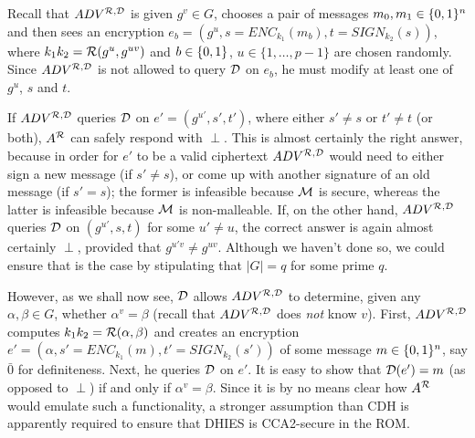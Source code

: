Recall that $ADV^{\mathcal{R},\mathcal{D}}$ is given $g^v \in G$, chooses a pair of
messages $m_0,m_1 \in \{0,1\}^{n}$ and then sees an encryption $e_b = (g^u, s =
ENC_{k_1}(m_b), t = SIGN_{k_2}(s))$, where $k_1k_2 = \mathcal{R}(g^u, g^{uv})$ and 
$b \in \{0,1\}^{}$, $u \in \{1,\ldots,p-1\}$ are chosen randomly.
Since $ADV^{\mathcal{R},\mathcal{D}}$ is not allowed to query $\mathcal{D}$ on $e_b$, he must
modify at least one of $g^u$, $s$ and $t$. 

If $ADV^{\mathcal{R},\mathcal{D}}$ queries $\mathcal{D}$ on $e' = (g^{u'}, s', t')$, where
either $s' \neq s$ or $t' \neq t$ (or both), $A^{\mathcal{R}}$ can safely respond with
$\perp$. This is almost certainly the right answer, because in order for $e'$
to be a valid ciphertext $ADV^{\mathcal{R},\mathcal{D}}$ would need to either sign a new
message (if $s' \neq s$), or come up with another signature of an old message
(if $s' = s$); the former is infeasible because $\mathcal{M}$ is secure, whereas the
latter is infeasible because $\mathcal{M}$ is non-malleable.
If, on the other hand, $ADV^{\mathcal{R},\mathcal{D}}$ queries $\mathcal{D}$ on $(g^{u'},s,t)$
for some $u' \neq u$, the correct answer is again almost certainly $\perp$,
provided that
$g^{u'v} \neq g^{uv}$. Although we haven't done so, we could ensure that
is the case by stipulating that $|G| = q$ for some prime $q$.

However, as we shall now see, $\mathcal{D}$ allows $ADV^{\mathcal{R},\mathcal{D}}$ to determine,
given any $\alpha,\beta \in G$, whether $\alpha^v = \beta$ (recall that
$ADV^{\mathcal{R},\mathcal{D}}$ does {\it not} know $v$). First, $ADV^{\mathcal{R},\mathcal{D}}$
computes $k_1k_2 = \mathcal{R}(\alpha,\beta)$ and creates an encryption $e' =
(\alpha, s' = ENC_{k_1}(m), t' = SIGN_{k_2}(s'))$ of some message $m \in
\{0,1\}^{n}$, say $\bar{0}$ for definiteness. Next, he queries $\mathcal{D}$ on $e'$.
It is easy to show that $\mathcal{D}(e') = m$ (as opposed to $\perp$) if and only if
$\alpha^v = \beta$. Since it is by no means clear how $A^{\mathcal{R}}$ would emulate
such a functionality, a stronger assumption than CDH is apparently required to
ensure that DHIES is CCA2-secure in the ROM. 

